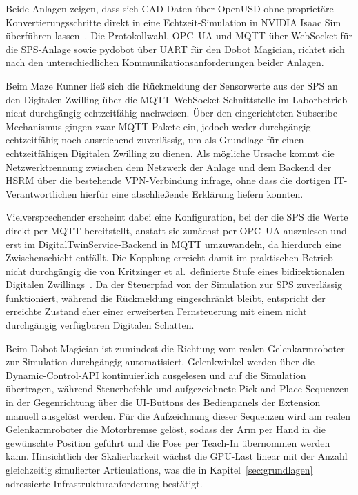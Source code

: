 Beide Anlagen zeigen, dass sich CAD-Daten über OpenUSD ohne proprietäre Konvertierungsschritte direkt in eine Echtzeit-Simulation in NVIDIA Isaac Sim überführen lassen~\cite{pixar_openusd}. Die Protokollwahl, OPC~UA und MQTT über WebSocket für die SPS-Anlage sowie pydobot über UART für den Dobot Magician, richtet sich nach den unterschiedlichen Kommunikationsanforderungen beider Anlagen.

Beim Maze Runner ließ sich die Rückmeldung der Sensorwerte aus der SPS an den Digitalen Zwilling über die MQTT-WebSocket-Schnittstelle im Laborbetrieb nicht durchgängig echtzeitfähig nachweisen. Über den eingerichteten Subscribe-Mechanismus gingen zwar MQTT-Pakete ein, jedoch weder durchgängig echtzeitfähig noch ausreichend zuverlässig, um als Grundlage für einen echtzeitfähigen Digitalen Zwilling zu dienen. Als mögliche Ursache kommt die Netzwerktrennung zwischen dem Netzwerk der Anlage und dem Backend der HSRM über die bestehende VPN-Verbindung infrage, ohne dass die dortigen IT-Verantwortlichen hierfür eine abschließende Erklärung liefern konnten.

Vielversprechender erscheint dabei eine Konfiguration, bei der die SPS die Werte direkt per MQTT bereitstellt, anstatt sie zunächst per OPC~UA auszulesen und erst im DigitalTwinService-Backend in MQTT umzuwandeln, da hierdurch eine Zwischenschicht entfällt. Die Kopplung erreicht damit im praktischen Betrieb nicht durchgängig die von Kritzinger et al.\ definierte Stufe eines bidirektionalen Digitalen Zwillings~\cite{kritzinger2018}. Da der Steuerpfad von der Simulation zur SPS zuverlässig funktioniert, während die Rückmeldung eingeschränkt bleibt, entspricht der erreichte Zustand eher einer erweiterten Fernsteuerung mit einem nicht durchgängig verfügbaren Digitalen Schatten.

Beim Dobot Magician ist zumindest die Richtung vom realen Gelenkarmroboter zur Simulation durchgängig automatisiert. Gelenkwinkel werden über die Dynamic-Control-API kontinuierlich ausgelesen und auf die Simulation übertragen, während Steuerbefehle und aufgezeichnete Pick-and-Place-Sequenzen in der Gegenrichtung über die UI-Buttons des Bedienpanels der Extension manuell ausgelöst werden. Für die Aufzeichnung dieser Sequenzen wird am realen Gelenkarmroboter die Motorbremse gelöst, sodass der Arm per Hand in die gewünschte Position geführt und die Pose per Teach-In übernommen werden kann. Hinsichtlich der Skalierbarkeit wächst die GPU-Last linear mit der Anzahl gleichzeitig simulierter Articulations, was die in Kapitel~\ref{sec:grundlagen} adressierte Infrastrukturanforderung bestätigt.

